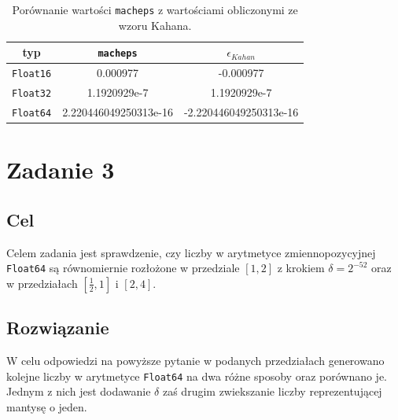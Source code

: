 \documentclass{article}
\begin{document}
\begin{table}[h!]
    \centering
    \begin{tabular}{ |c|c|c| }
    \hline
    typ & \texttt{macheps} & $\epsilon_{Kahan}$ \\
    \hline
    \texttt{Float16} & 0.000977 & -0.000977 \\
    \hline
    \texttt{Float32} & 1.1920929e-7 & 1.1920929e-7 \\
    \hline
    \texttt{Float64} & 2.220446049250313e-16 & -2.220446049250313e-16 \\
    \hline
    \end{tabular}
    \caption{Porównanie wartości \texttt{macheps} z wartościami obliczonymi ze wzoru Kahana.}
\end{table}
\section{Zadanie 3}
\subsection{Cel}
Celem zadania jest sprawdzenie, czy liczby w arytmetyce zmiennopozycyjnej \texttt{Float64} są równomiernie rozłożone w przedziale $[1, 2]$ z krokiem $\delta = 2^{-52}$ oraz w przedziałach $[\frac{1}{2}, 1]$ i $[2, 4]$.
\subsection{Rozwiązanie}
W celu odpowiedzi na powyższe pytanie w podanych przedziałach generowano kolejne liczby w arytmetyce \texttt{Float64} na dwa różne sposoby oraz porównano je. Jednym z nich jest dodawanie $\delta$ zaś drugim zwiekszanie liczby reprezentującej mantysę o jeden.
\end{document}
